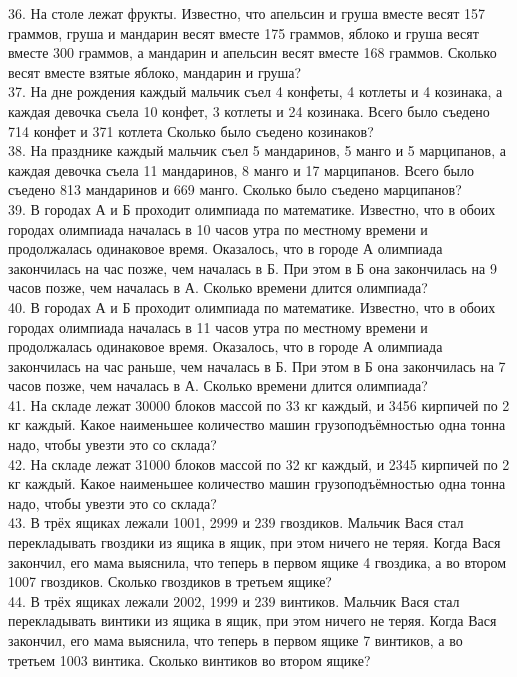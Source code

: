 \documentclass[12pt]{article}
\begin{document}
36. На столе лежат фрукты. Известно, что апельсин и груша вместе весят 157 граммов, груша и мандарин весят вместе 175 граммов, яблоко и груша весят вместе 300 граммов, а мандарин и апельсин весят вместе 168 граммов. Сколько весят вместе взятые яблоко, мандарин и груша?\\
37. На дне рождения каждый мальчик съел 4 конфеты, 4 котлеты и 4 козинака, а каждая девочка съела 10 конфет, 3 котлеты и 24 козинака. Всего было съедено 714 конфет и 371 котлета Сколько было съедено козинаков?\\
38. На празднике каждый мальчик съел 5 мандаринов, 5 манго и 5 марципанов, а каждая девочка съела 11 мандаринов, 8 манго и 17 марципанов. Всего было съедено 813 мандаринов и 669 манго. Сколько было съедено марципанов?\\
39. В городах А и Б проходит олимпиада по математике. Известно, что в обоих городах олимпиада началась в 10 часов утра по местному времени и продолжалась одинаковое время. Оказалось, что в городе А олимпиада закончилась на час позже, чем началась в Б. При этом в Б она закончилась на 9 часов позже, чем началась в А. Сколько времени длится олимпиада?\\
40. В городах А и Б проходит олимпиада по математике. Известно, что в обоих городах олимпиада началась в 11 часов утра по местному времени и продолжалась одинаковое время. Оказалось, что в городе А олимпиада закончилась на час раньше, чем началась в Б. При этом в Б она закончилась на 7 часов позже, чем началась в А. Сколько времени длится олимпиада?\\
41. На складе лежат 30000 блоков массой по 33 кг каждый, и 3456 кирпичей по 2 кг каждый. Какое наименьшее количество машин грузоподъёмностью одна тонна надо, чтобы увезти это со склада?\\
42. На складе лежат 31000 блоков массой по 32 кг каждый, и 2345 кирпичей по 2 кг каждый. Какое наименьшее количество машин грузоподъёмностью одна тонна надо, чтобы увезти это со склада?\\
43. В трёх ящиках лежали 1001, 2999 и 239 гвоздиков. Мальчик Вася стал перекладывать гвоздики из ящика в ящик, при этом ничего не теряя. Когда Вася закончил, его мама выяснила, что теперь в первом ящике 4 гвоздика, а во втором 1007 гвоздиков. Сколько гвоздиков в третьем ящике?\\
44. В трёх ящиках лежали 2002, 1999 и 239 винтиков. Мальчик Вася стал перекладывать винтики из ящика в ящик, при этом ничего не теряя. Когда Вася закончил, его мама выяснила, что теперь в первом ящике 7 винтиков, а во третьем 1003 винтика. Сколько винтиков во втором ящике?\\
\end{document}
